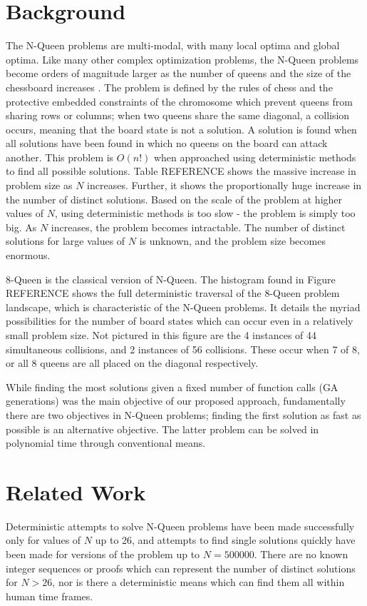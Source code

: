 \documentclass[conference]{IEEEtran}
\begin{document}
\section{Background}
The N-Queen problems are multi-modal, with many local optima and global optima. 
Like many other complex optimization problems, the N-Queen problems become orders of magnitude larger as the number of queens and the size of the chessboard increases \cite{homaifar1992queens}. The problem is defined by the rules of chess and the protective embedded constraints of the chromosome which prevent queens from sharing rows or columns; when two queens share the same diagonal, a collision occurs, meaning that the board state is not a solution. A solution is found when all solutions have been found in which no queens on the board can attack another. This problem is {$O(n!)$} when approached using deterministic methods to find all possible solutions. Table {REFERENCE} shows the massive increase in problem size as $N$ increases. Further, it shows the proportionally huge increase in the number of distinct solutions. Based on the scale of the problem at higher values of $N$, using deterministic methods is too slow - the problem is simply too big. As $N$ increases, the problem becomes intractable. The number of distinct solutions for large values of $N$ is unknown, and the problem size becomes enormous. 

8-Queen is the classical version of N-Queen. The histogram found in Figure {REFERENCE} shows the full deterministic traversal of the 8-Queen problem landscape, which is characteristic of the N-Queen problems. It details the myriad possibilities for the number of board states which can occur even in a relatively small problem size. Not pictured in this figure are the 4 instances of 44 simultaneous collisions, and 2 instances of 56 collisions. These occur when 7 of 8, or all 8 queens are all placed on the diagonal respectively. 

While finding the most solutions given a fixed number of function calls (GA generations) was the main objective of our proposed approach, fundamentally there are two objectives in N-Queen problems; finding the first solution as fast as possible is an alternative objective. The latter problem can be solved in polynomial time through conventional means.

\section{Related Work}
Deterministic attempts to solve N-Queen problems have been made successfully only for values of $N$ up to 26, and attempts to find single solutions quickly have been made for versions of the problem up to {$N = 500000$}. There are no known integer sequences or proofs which can represent the number of distinct solutions for $N > 26$, nor is there a deterministic means which can find them all within human time frames.
\end{document}
